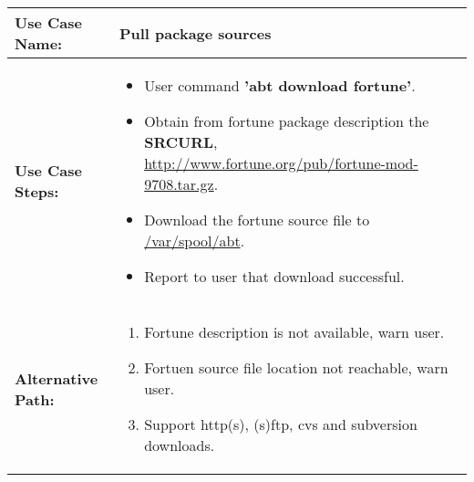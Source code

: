 \medskip

\begin{tabularx}{\linewidth}{|l|X|}
\hline
\textbf{Use Case Name:} & \textbf{Pull package sources} \\
\hline
\textbf{Use Case Steps:} & 
\begin{minipage}{\linewidth} 
  \vspace{0.05em}
  \begin{itemize}
    \item User command \textbf{'abt download fortune'}.
    \item Obtain from fortune package description the \textbf{SRCURL}, \url{http://www.fortune.org/pub/fortune-mod-9708.tar.gz}.
    \item Download the fortune source file to \url{/var/spool/abt}.
    \item Report to user that download successful.
  \end{itemize}
  \vspace{0.05em}
\end{minipage}
\\
\hline 
\textbf{Alternative Path:} &
\begin{minipage}{\linewidth}
  \vspace{0.05em} 
  \begin{enumerate}
    \item Fortune description is not available, warn user.
    \item Fortuen source file location not reachable, warn user.
    \item Support http(s), (s)ftp, cvs and subversion downloads.
  \end{enumerate}
  \vspace{0.05em} 
\end{minipage}
\\
\hline
\end{tabularx}
